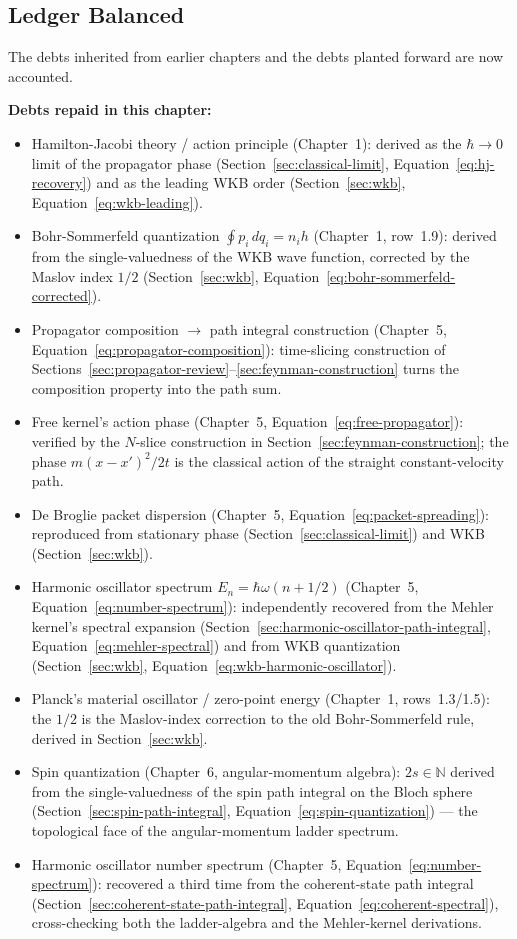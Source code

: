 \subsection{Ledger Balanced}

The debts inherited from earlier chapters and the debts planted forward are now accounted.

\medskip\noindent\textbf{Debts repaid in this chapter:}
\begin{itemize}
\item Hamilton-Jacobi theory / action principle (Chapter~1): derived as the $\hbar \to 0$ limit of the propagator phase (Section~\ref{sec:classical-limit}, Equation~\eqref{eq:hj-recovery}) and as the leading WKB order (Section~\ref{sec:wkb}, Equation~\eqref{eq:wkb-leading}).
\item Bohr-Sommerfeld quantization $\oint p_i\,dq_i = n_i h$ (Chapter~1, row~1.9): derived from the single-valuedness of the WKB wave function, corrected by the Maslov index $1/2$ (Section~\ref{sec:wkb}, Equation~\eqref{eq:bohr-sommerfeld-corrected}).
\item Propagator composition $\to$ path integral construction (Chapter~5, Equation~\eqref{eq:propagator-composition}): time-slicing construction of Sections~\ref{sec:propagator-review}--\ref{sec:feynman-construction} turns the composition property into the path sum.
\item Free kernel's action phase (Chapter~5, Equation~\eqref{eq:free-propagator}): verified by the $N$-slice construction in Section~\ref{sec:feynman-construction}; the phase $m(x-x')^2/2t$ is the classical action of the straight constant-velocity path.
\item De Broglie packet dispersion (Chapter~5, Equation~\eqref{eq:packet-spreading}): reproduced from stationary phase (Section~\ref{sec:classical-limit}) and WKB (Section~\ref{sec:wkb}).
\item Harmonic oscillator spectrum $E_n = \hbar\omega(n+1/2)$ (Chapter~5, Equation~\eqref{eq:number-spectrum}): independently recovered from the Mehler kernel's spectral expansion (Section~\ref{sec:harmonic-oscillator-path-integral}, Equation~\eqref{eq:mehler-spectral}) and from WKB quantization (Section~\ref{sec:wkb}, Equation~\eqref{eq:wkb-harmonic-oscillator}).
\item Planck's material oscillator / zero-point energy (Chapter~1, rows~1.3/1.5): the $1/2$ is the Maslov-index correction to the old Bohr-Sommerfeld rule, derived in Section~\ref{sec:wkb}.
\item Spin quantization (Chapter~6, angular-momentum algebra): $2s \in \mathbb{N}$ derived from the single-valuedness of the spin path integral on the Bloch sphere (Section~\ref{sec:spin-path-integral}, Equation~\eqref{eq:spin-quantization}) --- the topological face of the angular-momentum ladder spectrum.
\item Harmonic oscillator number spectrum (Chapter~5, Equation~\eqref{eq:number-spectrum}): recovered a third time from the coherent-state path integral (Section~\ref{sec:coherent-state-path-integral}, Equation~\eqref{eq:coherent-spectral}), cross-checking both the ladder-algebra and the Mehler-kernel derivations.
\end{itemize}

